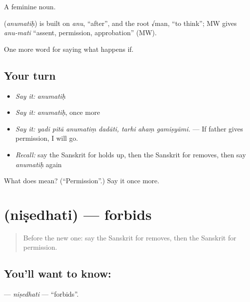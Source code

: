 A feminine noun.

\begin{cousinweb}
\textbf{} (\emph{anumatiḥ}) is built on \emph{anu}, \textquotedblleft{}after\textquotedblright{}, and the root √man, \textquotedblleft{}to think\textquotedblright{}; MW gives \emph{anu-mati} \textquotedblleft{}assent, permission, approbation\textquotedblright{} (MW).
\end{cousinweb}

\begin{grammarlens}[title={What you've built}]
One more word for saying what happens if.
\end{grammarlens}

\subsection*{Your turn}
\begin{itemize}
\raggedright
  \item \emph{Say it:} \emph{anumatiḥ}
  \item \emph{Say it:} \emph{anumatiḥ}, once more
  \item \emph{Say it:} \emph{yadi pitā anumatiṃ dadāti, tarhi ahaṃ gamiṣyāmi.} — If father gives permission, I will go.
  \item \emph{Recall:} say the Sanskrit for holds up, then the Sanskrit for removes, then say \emph{anumatiḥ} again
\end{itemize}

\begin{tcolorbox}[breakable,colback=teal!4,colframe=teal!35!black,title={Before you move on}]
What does  mean? (\textquotedblleft{}Permission\textquotedblright{}.) Say it once more.
\end{tcolorbox}
\section[\texorpdfstring{\sk{निषेधति} (niṣedhati)}{निषेधति (niṣedhati)}]{ (niṣedhati) — forbids}

\label{lesson:SA-C373-nisedhati}



\begin{quote}
Before the new one: say the Sanskrit for removes, then the Sanskrit for permission.
\end{quote}

\subsection*{You'll want to know: }
\textbf{} — \emph{niṣedhati} — \textquotedblleft{}forbids\textquotedblright{}.

